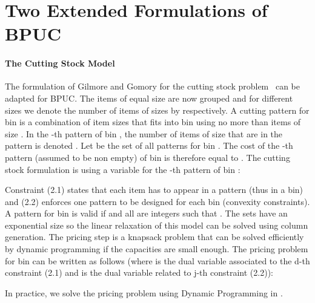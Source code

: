 \section{Two Extended Formulations of BPUC}
\label{af}


\paragraph{\textbf{The Cutting Stock Model}}
The  formulation of Gilmore and Gomory for the cutting stock problem~\cite{gilmore1961linear} can  be  adapted for BPUC. The items of equal size are now grouped and for  different sizes we denote the number of items of sizes   by   respectively.
A cutting pattern for bin  is a combination of item sizes that fits into bin  using no more than  items of size . 
In the -th pattern of bin , the number of items of size  that are in the pattern is denoted . 
Let  be the set of all patterns for bin . 
The cost of the -th pattern (assumed to be non empty) of bin  is therefore equal to . The cutting stock formulation is using a variable  for the -th pattern of bin :

Constraint (2.1) states that each item has to appear in a pattern (thus in a bin) and (2.2) enforces one pattern to be designed for each bin (convexity constraints). A pattern  for bin  is valid if  and all  are integers such that . The sets  have an exponential size so the linear relaxation of this model can be solved using column generation. The pricing step is a knapsack problem that can be solved efficiently by dynamic programming if the capacities are small enough. The pricing problem for bin  can be written as follows (where  is the dual variable associated to the d-th constraint (2.1) and  is the dual variable related to j-th constraint (2.2)):

In practice, we solve the pricing problem using Dynamic Programming in .
